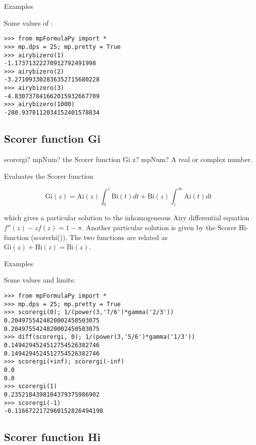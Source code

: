 Examples

Some values of :

\begin{lstlisting}
>>> from mpFormulaPy import *
>>> mp.dps = 25; mp.pretty = True
>>> airybizero(1)
-1.17371322270912792491998
>>> airybizero(2)
-3.271093302836352715680228
>>> airybizero(3)
-4.830737841662015932667709
>>> airybizero(1000)
-280.9378112034152401578834
\end{lstlisting}



\subsection{Scorer function Gi}

\begin{mpFunctionsExtract}
	\mpFunctionOne
	{scorergi? mpNum? the Scorer function Gi}
	{z? mpNum? A real or complex number.}
\end{mpFunctionsExtract}


\vpara
Evaluates the Scorer function

\begin{equation}
\text{Gi}(z) = \text{Ai}(z) \int_0^z \text{Bi}(t)dt + \text{Bi}(z) \int_z^{\infty} \text{Ai}(t)dt 
\end{equation}

which gives a particular solution to the inhomogeneous Airy differential equation $f''(z)-z f(z) = 1-\pi$. Another particular solution is given by the Scorer Hi-function
(scorerhi()). The two functions are related as $\text{Gi}(z) + \text{Hi}(z) = \text{Bi}(z)$.

Examples

Some values and limits:

\begin{lstlisting}
>>> from mpFormulaPy import *
>>> mp.dps = 25; mp.pretty = True
>>> scorergi(0); 1/(power(3,'7/6')*gamma('2/3'))
0.2049755424820002450503075
0.2049755424820002450503075
>>> diff(scorergi, 0); 1/(power(3,'5/6')*gamma('1/3'))
0.1494294524512754526382746
0.1494294524512754526382746
>>> scorergi(+inf); scorergi(-inf)
0.0
0.0
>>> scorergi(1)
0.2352184398104379375986902
>>> scorergi(-1)
-0.1166722172960152826494198
\end{lstlisting}




\subsection{Scorer function Hi}

